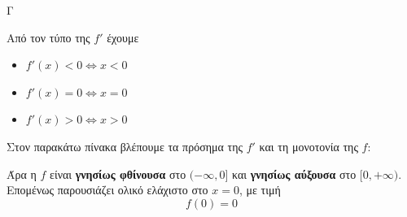 \begin{thema}{Γ}
\begin{erwthma}
\item Από τον τύπο της $f'$ έχουμε
\begin{itemize}
\item $f'(x)<0\Leftrightarrow x<0$
\item $f'(x)=0\Leftrightarrow x=0$
\item $f'(x)>0\Leftrightarrow x>0$
\end{itemize}
Στον παρακάτω πίνακα βλέπουμε τα πρόσημα της $f'$ και τη μονοτονία της $f$:
\begin{center}
\end{center}
Άρα η $f$ είναι \textbf{γνησίως φθίνουσα} στο $(-\infty,0]$ και \textbf{γνησίως αύξουσα} στο $[0,+\infty)$.
Επομένως παρουσιάζει ολικό ελάχιστο στο $x=0$, με τιμή
\[f(0)=0\]
\end{erwthma}
\end{thema}

